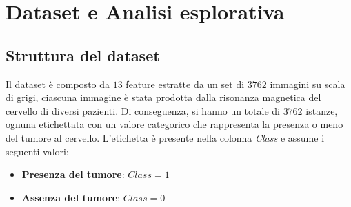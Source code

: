 \chapter{Dataset e Analisi esplorativa} \label{cap:dataset}
\section{Struttura del dataset}
Il dataset è composto da $13$ feature estratte da un set di $3762$ immagini su
scala di grigi, ciascuna immagine è stata prodotta dalla risonanza magnetica del
cervello di diversi pazienti. Di conseguenza, si hanno un totale di $3762$
istanze, ognuna etichettata con un valore categorico che rappresenta la presenza
o meno del tumore al cervello. L'etichetta è presente nella colonna \textit{Class}
e assume i seguenti valori:
\begin{itemize}
      \item \textbf{Presenza del tumore}: $Class = 1$
      \item \textbf{Assenza del tumore}: $Class = 0$
\end{itemize}

